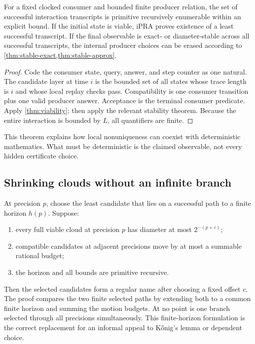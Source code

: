 \begin{theorem}\label{thm:relational-composition}
For a fixed clocked consumer and bounded finite producer relation, the set of successful interaction transcripts is primitive recursively enumerable within an explicit bound.  If the initial state is viable, iPRA proves existence of a least successful transcript.  If the final observable is exact- or diameter-stable across all successful transcripts, the internal producer choices can be erased according to \cref{thm:stable-exact,thm:stable-approx}.
\end{theorem}

\begin{proof}
Code the consumer state, query, answer, and step counter as one natural.  The candidate layer at time $i$ is the bounded set of all states whose trace length is $i$ and whose local replay checks pass.  Compatibility is one consumer transition plus one valid producer answer.  Acceptance is the terminal consumer predicate.  Apply \cref{thm:viability}; then apply the relevant stability theorem.  Because the entire interaction is bounded by $L$, all quantifiers are finite.
\end{proof}

This theorem explains how local nonuniqueness can coexist with deterministic mathematics.  What must be deterministic is the claimed observable, not every hidden certificate choice.

\subsection{Shrinking clouds without an infinite branch}

At precision $p$, choose the least candidate that lies on a successful path to a finite horizon $h(p)$.  Suppose:

\begin{enumerate}
  \item every full viable cloud at precision $p$ has diameter at most $2^{-(p+c)}$;
  \item compatible candidates at adjacent precisions move by at most a summable rational budget;
  \item the horizon and all bounds are primitive recursive.
\end{enumerate}

Then the selected candidates form a regular name after choosing a fixed offset $c$.  The proof compares the two finite selected paths by extending both to a common finite horizon and summing the motion budgets.  At no point is one branch selected through all precisions simultaneously.  This finite-horizon formulation is the correct replacement for an informal appeal to Kőnig's lemma or dependent choice.

